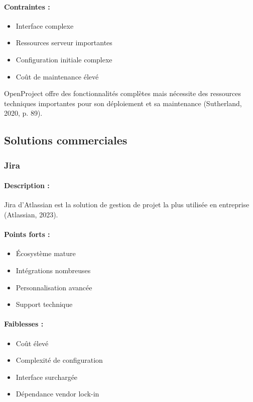 \paragraph{Contraintes :}
\begin{itemize}
    \item Interface complexe
    \item Ressources serveur importantes
    \item Configuration initiale complexe
    \item Coût de maintenance élevé
\end{itemize}

OpenProject offre des fonctionnalités complètes mais nécessite des ressources techniques importantes pour son déploiement et sa maintenance (Sutherland, 2020, p. 89).

\subsection{Solutions commerciales}

\subsubsection{Jira}
\paragraph{Description :} Jira d'Atlassian est la solution de gestion de projet la plus utilisée en entreprise (Atlassian, 2023).

\paragraph{Points forts :}
\begin{itemize}
    \item Écosystème mature
    \item Intégrations nombreuses
    \item Personnalisation avancée
    \item Support technique
\end{itemize}

\paragraph{Faiblesses :}
\begin{itemize}
    \item Coût élevé
    \item Complexité de configuration
    \item Interface surchargée
    \item Dépendance vendor lock-in
\end{itemize}

